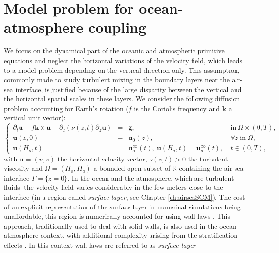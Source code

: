 \section{Model problem for ocean-atmosphere coupling}\label{sec:couplingProblem}
We focus on the dynamical part of the oceanic and atmospheric primitive equations and neglect the horizontal variations of 
the velocity field, which leads to a model problem  depending 
on the vertical direction only. This assumption, commonly made 
to study turbulent mixing in the boundary layers near the 
air-sea interface, is justified because of the large disparity 
between the vertical and the horizontal spatial scales in these layers. 
We consider the following diffusion problem accounting for Earth’s 
rotation ($f$ is the Coriolis frequency and $\mathbf{k}$ a vertical unit vector):
\begin{equation*}
\left\{
\begin{array}{rcll}
\partial_t \mathbf{u} + f \mathbf{k} \times \mathbf{u} - \partial_z \left( \nu(z,t) \partial_z \mathbf{u} \right) &=& \mathbf{g}, & \mbox{in}\;\Omega \times (0,T), \\
\mathbf{u}(z,0) &=& \mathbf{u}_0(z), & \forall z \; \mbox{in}\; \Omega, \\
\mathbf{u}(H_o,t) &=& \mathbf{u}_o^\infty(t), ~ \mathbf{u}(H_a,t) = \mathbf{u}_a^\infty(t), ~ & t \in (0,T),  
\end{array}
\right.
\end{equation*}
with $\mathbf{u} = (u,v)$ the horizontal velocity vector,
$\nu(z,t) > 0$ the turbulent viscosity and 
$\Omega = (H_o,H_a)$ a bounded open subset of $\mathbb{R}$
containing the air-sea interface $\Gamma = \{z = 0\}$.
In the ocean and the atmosphere, which are  turbulent fluids,
the velocity field varies considerably in the few 
meters close to the interface (in a region called 
\textit{surface layer}, see Chapter \ref{ch:airseaSCM}).
The cost of an explicit representation of the surface layer
in numerical simulations being
unaffordable, this region is numerically accounted for 
using wall laws \cite[e.g.][]{mohammadi_rough_1998}. This approach, 
traditionally used to deal with solid walls, is also used
in the ocean-atmosphere context, with additional complexity 
arising from the stratification effects \cite[e.g.][]{pelletier_two-sided_2021}.
In this context wall laws are referred to as \textit{surface layer} 
